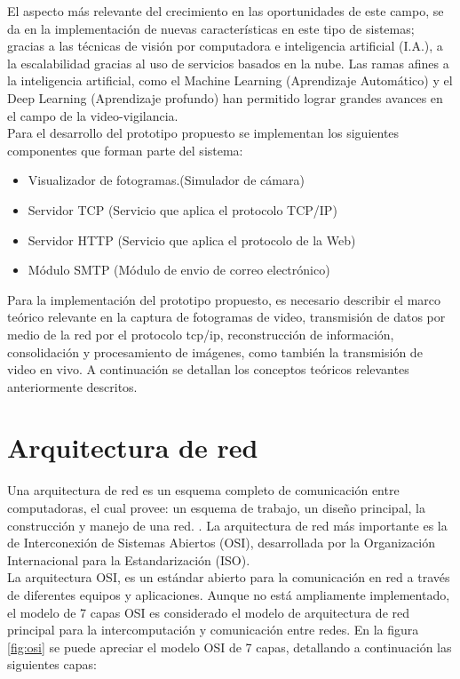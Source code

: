 El aspecto más relevante del crecimiento en las oportunidades de este campo, se da en la implementación de nuevas características en este tipo de sistemas; gracias a las técnicas de visión por computadora e inteligencia artificial (I.A.), a la escalabilidad gracias al uso de servicios basados en la nube. Las ramas afines a la inteligencia artificial, como el Machine Learning (Aprendizaje Automático) y el Deep Learning (Aprendizaje profundo) han permitido lograr grandes avances en el campo de la video-vigilancia.\\

Para el desarrollo del prototipo propuesto se implementan los siguientes componentes que forman parte del sistema:
\begin{itemize}
    \item Visualizador de fotogramas.(Simulador de cámara)
    \item Servidor TCP (Servicio que aplica el protocolo TCP/IP)
    \item Servidor HTTP (Servicio que aplica el protocolo de la Web)
    \item Módulo SMTP (Módulo de envio de correo electrónico)
\end{itemize}

Para la implementación del prototipo propuesto, es necesario describir el marco teórico relevante en la captura de fotogramas de video, transmisión de datos por medio de la red por el protocolo tcp/ip, reconstrucción de información, consolidación y procesamiento de imágenes, como también la transmisión de video en vivo. A continuación se detallan los conceptos teóricos relevantes anteriormente descritos.\\

\section{Arquitectura de red}
Una arquitectura de red es un esquema completo de comunicación entre computadoras, el cual provee: un esquema de trabajo, un diseño principal, la construcción y manejo de una red. \cite[1]{networkProtocolos:handbook}. La arquitectura de red más importante es la de Interconexión de Sistemas Abiertos (OSI), desarrollada por la Organización Internacional para la Estandarización (ISO).\\

La arquitectura OSI, es un estándar abierto para la comunicación en red a través de diferentes equipos y aplicaciones. Aunque no está ampliamente implementado, el modelo de 7 capas OSI es considerado el modelo de arquitectura de red principal para la intercomputación y comunicación entre redes. En la figura \ref{fig:osi} se puede apreciar el modelo OSI de 7 capas, detallando a continuación las siguientes capas:

